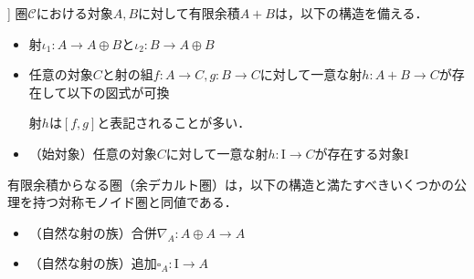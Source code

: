 \documentclass[type_judgement.tex]{subfiles}
\begin{document}
\begin{defn}]
圏$\mathcal{C}$における対象$A,B$に対して有限余積$A + B$は，以下の構造を備える．
\begin{itemize}
    \item 射$\iota_1:A \rightarrow A \oplus B$と$\iota_2:B \rightarrow A \oplus B$
    \item 任意の対象$C$と射の組$f:A \rightarrow C, g:B \rightarrow C$に対して一意な射$h:A + B \rightarrow C$が存在して以下の図式が可換
    \begin{center}
    \end{center}
        射$h$は$[ f,g ]$と表記されることが多い．
    \item （始対象）任意の対象$C$に対して一意な射$h:\mathrm{I} \rightarrow C$が存在する対象$\mathrm{I}$
\end{itemize}
\end{defn}

有限余積からなる圏（余デカルト圏）は，以下の構造と満たすべきいくつかの公理\cite{selinger09}を持つ対称モノイド圏と同値である．
\begin{itemize}
    \item （自然な射の族）合併$\nabla_A:A \oplus A \rightarrow A$
    \item （自然な射の族）追加$\square_A:\mathrm{I} \rightarrow A$
\end{itemize}
\end{document}
